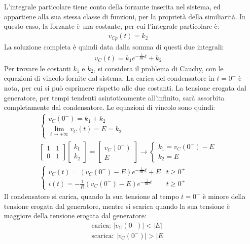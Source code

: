 \documentclass{article}
\numberwithin{equation}{subsection}
\begin{document}
L'integrale particolare tiene conto della forzante inserita nel sistema, ed appartiene alla sua stessa classe di funzioni, per la proprietà della similiarità. In questo caso, 
la forzante è una costante, per cui l'integrale particolare è:
\begin{gather*}
    v_{Cp}(t)=k_2
\end{gather*}
La soluzione completa è quindi data dalla somma di questi due integrali:
\begin{gather*}
    v_C(t)=k_1e^{-\frac{1}{RC}t}+k_2
\end{gather*}
Per trovare le costanti $k_1$ e $k_2$, si considera il problema di Cauchy, con le equazioni di vincolo fornite dal sistema. La carica del condensatore in $t=0^-$ è nota, 
per cui si può esprimere rispetto alle due costanti. La tensione erogata dal generatore, per tempi tendenti asintoticamente all'infinito, sarà assorbita 
completamente dal condensatore. Le equazioni di vincolo sono quindi:
\begin{gather*}
    \begin{cases}
        v_C(0^-)=k_1+k_2\\
        \displaystyle\lim_{t\to+\infty}v_C(t)=E=k_2
    \end{cases}\\
    \begin{bmatrix}
        1&1\\0&1
    \end{bmatrix}\begin{bmatrix}
        k_1\\k_2
    \end{bmatrix}=\begin{bmatrix}
        v_C(0^-)\\E
    \end{bmatrix}\to
    \begin{cases}
        k_1=v_C(0^-)-E\\
        k_2=E
    \end{cases}\\
    \begin{cases}
        v_C(t)=(v_C(0^-)-E)e^{-\frac{1}{RC}t}+E&t\geq0^+\\
        i(t)=-\displaystyle\frac{1}{R}(v_C(0^-)-E)e^{-\frac{1}{RC}t} &t\geq0^+
    \end{cases}
\end{gather*}
Il condensatore si carica, quando la sua tensione al tempo $t=0^-$ è minore della tensione erogata dal generatore, mentre si scarica quando la sua tensione è maggiore della 
tensione erogata dal generatore:
\begin{gather*}
    \mbox{carica: }|v_C(0^-)|<|E|\\
    \mbox{scarica: }|v_C(0^-)|>|E|
\end{gather*}
\end{document}
